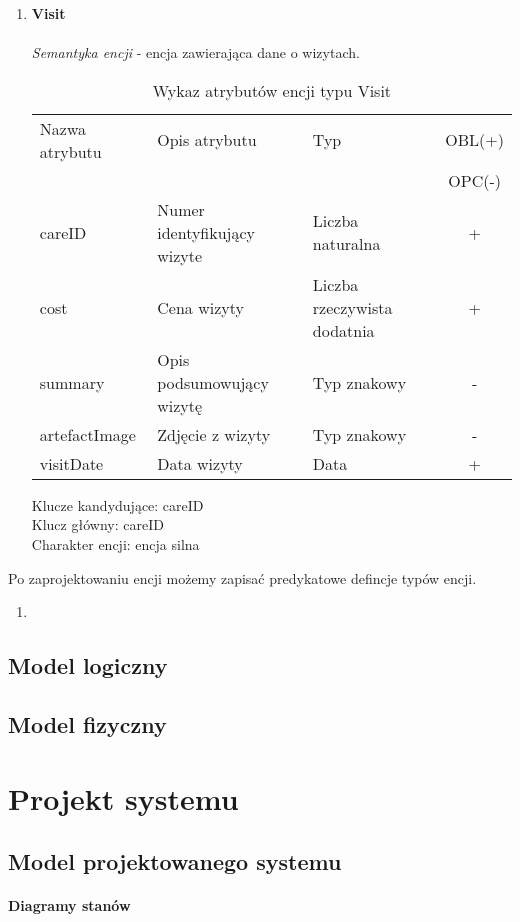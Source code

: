 \documentclass[12pt,twoside]{report}
\begin{document}
\begin{enumerate}[start=10,label={\bfseries ENC$\backslash$0\arabic*}]
\item \textbf{Visit}\\ \\
\textit{Semantyka encji} - encja zawierająca dane o wizytach. 

\begin{table}[h!]
	\centering
	\begin{tabular}{|l|l|l|c|}
		\hline
		Nazwa atrybutu & Opis atrybutu & Typ & OBL(+) \\
		& & &  OPC(-) \\
		\hline
		careID & Numer identyfikujący wizyte & Liczba naturalna & + \\
		\hline
		cost & Cena wizyty & Liczba rzeczywista dodatnia & + \\
		\hline
		summary & Opis podsumowujący wizytę & Typ znakowy & - \\
		\hline
		artefactImage & Zdjęcie z wizyty & Typ znakowy & - \\
		\hline
		visitDate & Data wizyty & Data & + \\
		\hline
	\end{tabular}
	\caption{Wykaz atrybutów encji typu Visit }
\end{table}
Klucze kandydujące: careID \\
Klucz główny: careID \\
Charakter encji: encja silna \\


\end{enumerate}
Po zaprojektowaniu encji możemy zapisać predykatowe defincje typów encji.
\begin{enumerate}[start=1,label={\bfseries ENC$\backslash$00\arabic*}]
	\item 
\end{enumerate}
\section{Model logiczny}
\section{Model fizyczny}
\chapter{Projekt systemu}
\section{Model projektowanego systemu}
\subsubsection{Diagramy stanów}
\end{document}
